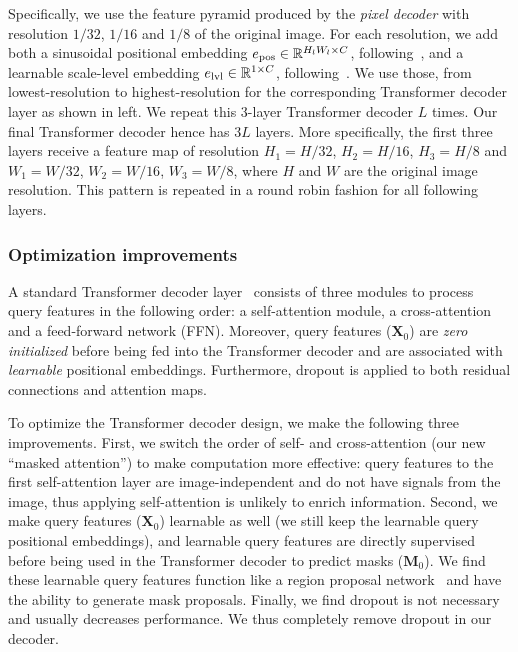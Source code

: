 Specifically, we use the feature pyramid produced by the \emph{pixel decoder} with resolution $1/32$, $1/16$ and $1/8$ of the original image. For each resolution, we add both a sinusoidal positional embedding $e_{\text{pos}} \in \mathbb{R}^{H_{l}W_{l} \times C}$, following~\cite{detr}, and a learnable scale-level embedding $e_{\text{lvl}} \in \mathbb{R}^{1 \times C}$, following~\cite{zhu2021deformable}. We use those, from lowest-resolution to highest-resolution for the corresponding Transformer decoder layer as shown in  left. We repeat this 3-layer Transformer decoder  $L$ times.  Our final Transformer decoder hence has $3L$ layers. More specifically, the first three layers receive a feature map of resolution $H_{1} = H/32$, $H_{2} = H/16$, $H_{3} = H/8$ and $W_{1} = W/32$, $W_{2} = W/16$, $W_{3} = W/8$, where $H$ and $W$ are the original image resolution. This pattern is repeated in a round robin fashion for all following layers.

\subsubsection{Optimization improvements}
\label{sec:method:arch:transformer_decoder:other}
A standard Transformer decoder layer~\cite{vaswani2017attention} consists of three modules to process query features in the following order: a self-attention module, a cross-attention and a feed-forward network (FFN). Moreover, query features ($\mathbf{X}_{0}$) are \emph{zero initialized} before being fed into the Transformer decoder and are associated with \emph{learnable} positional embeddings. Furthermore, dropout is applied to both residual connections and attention maps.

To optimize the Transformer decoder design, we make the following three improvements. First, we switch the order of self- and cross-attention (our new ``masked attention'') to make computation more effective: query features to the first self-attention layer are image-independent and do not have signals from the image, thus applying self-attention is unlikely to enrich information. Second, we make query features ($\mathbf{X}_{0}$) learnable as well (we still keep the learnable query positional embeddings), and learnable query features are directly supervised before being used in the Transformer decoder to predict masks ($\mathbf{M}_{0}$). We find these learnable query features function like a region proposal network~\cite{Ren2015a} and have the ability to generate mask proposals. Finally, we find dropout is not necessary and usually decreases performance. We thus  completely remove dropout in our decoder.



